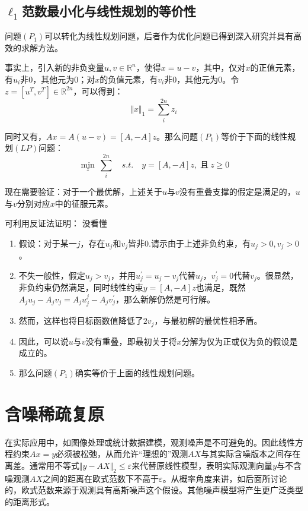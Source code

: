 \subsection{$\ell_1$范数最小化与线性规划的等价性}
{\heiti 问题$ (P_1) $可以转化为线性规划问题，后者作为优化问题已得到深入研究并具有高效的求解方法。}

事实上，引入新的非负变量$ u,v\in \mathbb{R}^n $，使得$ x =u-v $，其中，仅对$ x $的正值元素，有$ u_i $非0，其他元为0；对$ x $的负值元素，有$ v_i $非0，其他元为0。令$ z=[u^T,v^T]\in\mathbb{R}^{2n} $，可以得到：
\begin{equation}\label{key}
\Vert x\Vert_1 = \sum_{i}^{2n}z_i
\end{equation}

同时又有，$ Ax=A(u-v)=[A,-A]z $。那么问题$ (P_1) $等价于下面的线性规划$ (LP) $问题：
\begin{equation}\label{key}
\min_{z} \:\sum_{i}^{2n}\quad  s.t.\quad  y=[A,-A]z,\;\mbox{且}\:z\geq 0
\end{equation}

现在需要验证：{\heiti 对于一个最优解，上述关于$ u $与$ v $没有重叠支撑的假定是满足的，$ u $与$ v $分别对应$ x $中的征服元素。}

可利用反证法证明：{ 没看懂}
\begin{enumerate}
	\item 假设：对于某一$ j $，存在$ u_j $和$ v_j$皆非0.请示由于上述非负约束，有$ u_j>0,v_j>0 $。
	\item 不失一般性，假定$ u_j>v_j $，并用$ u^{'}_{j}=u_j-v_j $代替$ u_j $，$ v_j^{'}=0 $代替$ v_j $。很显然，非负约束仍然满足，同时线性约束$ y=[A,-A]z $也满足，既然$ A_j u_j -A_j v_j = A_j u^{j}_j - A_j v_j^{'} $，那么新解仍然是可行解。
	\item 然而，这样也将目标函数值降低了$ 2v_j $，与最初解的最优性相矛盾。
	\item 因此，可以说$ u $与$ v $没有重叠，即最初关于将$ x $分解为仅为正或仅为负的假设是成立的。
	\item {\heiti 那么问题$(P_1)$确实等价于上面的线性规划问题。}
\end{enumerate}




\section{含噪稀疏复原}
在实际应用中，如图像处理或统计数据建模，观测噪声是不可避免的。因此线性方程约束$Ax=y $必须被松弛，从而允许“理想的”观测$ AX $与其实际含噪版本之间存在离差。{\heiti 通常用不等式$ \Vert y-AX\Vert_2\leq \varepsilon $来代替原线性模型}，表明实际观测向量$ y $与不含噪观测$ AX $之间的距离在欧式范数下不高于$ \varepsilon $。从概率角度来讲，如后面所讨论的，欧式范数来源于观测具有高斯噪声这个假设。其他噪声模型将产生更广泛类型的距离形式。
	
